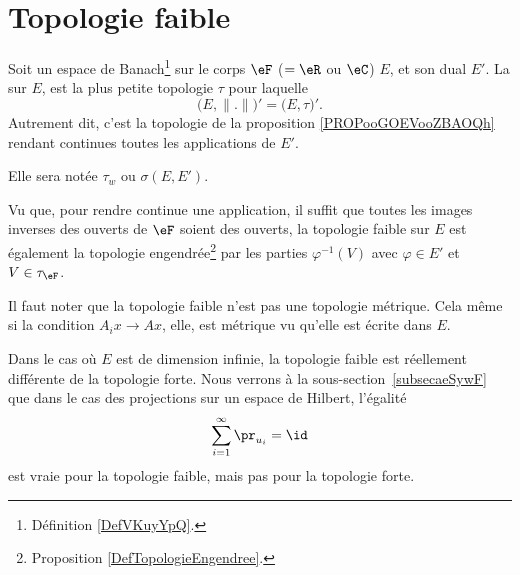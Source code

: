 

\section{Topologie faible}

\begin{definition}        \label{DEFooZGLDooRRarRj}
	Soit un espace de Banach\footnote{Définition \ref{DefVKuyYpQ}.} sur le corps \( \eF\) (\( =\eR\) ou \( \eC\)) \( E\), et son dual \( E'\). La  sur \( E\), est la plus petite topologie \( \tau\) pour laquelle
	\begin{equation}
		\big( E,\| . \| \big)'=\big( E,\tau \big)'.
	\end{equation}
	Autrement dit, c'est la topologie de la proposition \ref{PROPooGOEVooZBAOQh} rendant continues toutes les applications de \( E'\).

	Elle sera notée \( \tau_w\) ou \( \sigma(E,E')\).
\end{definition}

Vu que, pour rendre continue une application, il suffit que toutes les images inverses des ouverts de \( \eF\) soient des ouverts, la topologie faible sur \( E\) est également la topologie engendrée\footnote{Proposition \ref{DefTopologieEngendree}.} par les parties \( \varphi^{-1}(V)\) avec \( \varphi\in E'\) et \( V\in \tau_{\eF}\).

\begin{remark}
	Il faut noter que la topologie faible n'est pas une topologie métrique. Cela même si la condition \( A_ix\to Ax\), elle, est métrique vu qu'elle est écrite dans \( E\).

	Dans le cas où \( E\) est de dimension infinie, la topologie faible est réellement différente de la topologie forte. Nous verrons à la sous-section~\ref{subsecaeSywF} que dans le cas des projections sur un espace de Hilbert, l'égalité
	\begin{equation}
		\sum_{i=1}^{\infty}\pr_{u_i}=\id
	\end{equation}
	est vraie pour la topologie faible, mais pas pour la topologie forte.
\end{remark}


